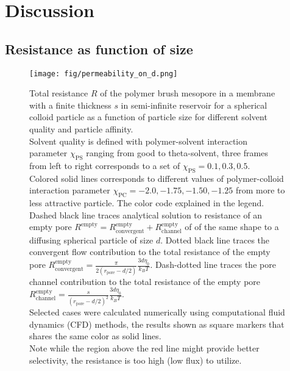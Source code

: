 \documentclass[12pt, a4paper]{article}
\newcommand\todo[1]{\textcolor{red}{#1}}
\begin{document}
% 

\section{Discussion}
\subsection{Resistance as function of size}

\begin{figure}
    \centering
    \texttt{[image: fig/permeability\_on\_d.png]}
    \caption{
        Total resistance $R$ of the polymer brush mesopore in a membrane with a finite thickness $s$ in semi-infinite reservoir for a spherical colloid particle as a function of particle size for different solvent quality and particle affinity.
        \\
        Solvent quality is defined with polymer-solvent interaction parameter $\chi_{\textrm{PS}}$ ranging from good to theta-solvent, three frames from left to right corresponds to a set of $\chi_{\textrm{PS}} = {0.1, 0.3, 0.5}$.
        \\
        Colored solid lines corresponds to different values of polymer-colloid interaction parameter $\chi_{\textrm{PC}} = {-2.0, -1.75, -1.50, -1.25}$ from more to less attractive particle. 
        The color code explained in the legend.
        \\
        Dashed black line traces analytical solution to resistance of an empty pore $R^{\textrm{empty}} = R^{\textrm{empty}}_{\textrm{convergent}} + R^{\textrm{empty}}_{\textrm{channel}}$ of of the same shape to a diffusing spherical particle of size $d$.
        Dotted black line traces the convergent flow contribution to the total resistance of the empty pore $R^{\textrm{empty}}_{\textrm{convergent}} = \frac{\pi}{2 (r_{\textrm{pore}} - d/2)} \frac{3 d \eta_0}{k_B T}$.
        Dash-dotted line traces the pore channel contribution to the total resistance of the empty pore
        $R^{\textrm{empty}}_{\textrm{channel}} = \frac{s}{(r_{\textrm{pore}} - d/2)^2} \frac{3  d \eta_0}{k_B T}$.
        \\
        Selected cases were calculated numerically using computational fluid dynamics (CFD) methods, the results shown as square markers that shares the same color as solid lines.
        \\
        Note while the region above the red line might provide better selectivity, the resistance is too high (low flux) to utilize.
        }
        \label{fig:resistivity_on_d}
\end{figure}
\end{document}
